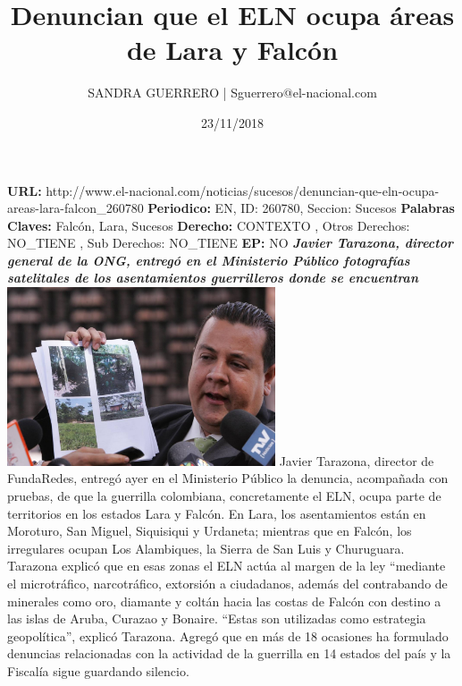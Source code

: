 \documentclass{article}%
\title{\textbf{Denuncian que el ELN ocupa áreas de Lara y Falcón}}%
\author{SANDRA GUERRERO | Sguerrero@el{-}nacional.com}%
\date{23/11/2018}%
\begin{document}
%
\normalsize%
\maketitle%
\textbf{URL: }%
http://www.el{-}nacional.com/noticias/sucesos/denuncian{-}que{-}eln{-}ocupa{-}areas{-}lara{-}falcon\_260780\newline%
%
\textbf{Periodico: }%
EN, %
ID: %
260780, %
Seccion: %
Sucesos\newline%
%
\textbf{Palabras Claves: }%
Falcón, Lara, Sucesos\newline%
%
\textbf{Derecho: }%
CONTEXTO%
, Otros Derechos: %
NO\_TIENE%
, Sub Derechos: %
NO\_TIENE%
\newline%
%
\textbf{EP: }%
NO\newline%
\newline%
%
\textbf{\textit{Javier Tarazona, director general de la ONG, entregó en el Ministerio Público fotografías satelitales de los asentamientos guerrilleros donde se encuentran}}%
\newline%
\newline%
%
\includegraphics[width=300px]{139.jpg}%
\newline%
%
Javier Tarazona, director de FundaRedes, entregó ayer en el Ministerio Público la denuncia, acompañada con pruebas, de que la guerrilla colombiana, concretamente el ELN, ocupa parte de territorios en los estados Lara y Falcón. En Lara, los asentamientos están en Moroturo, San Miguel, Siquisiqui y Urdaneta; mientras que en Falcón, los irregulares ocupan Los Alambiques, la Sierra de San Luis y Churuguara.%
\newline%
%
Tarazona explicó que en esas zonas el ELN actúa al margen de la ley “mediante el microtráfico, narcotráfico, extorsión a ciudadanos, además del contrabando de minerales como oro, diamante y coltán hacia las costas de Falcón con destino a las islas de Aruba, Curazao y Bonaire. “Estas son utilizadas como estrategia geopolítica”, explicó Tarazona.%
\newline%
%
Agregó que en más de 18 ocasiones ha formulado denuncias relacionadas con la actividad de la guerrilla en 14 estados del país y la Fiscalía sigue guardando silencio.%
\end{document}
